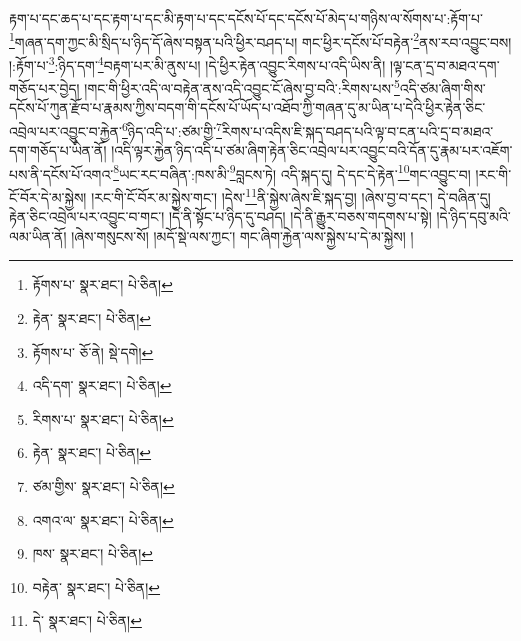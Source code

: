 རྟག་པ་དང་ཆད་པ་དང་རྟག་པ་དང་མི་རྟག་པ་དང་དངོས་པོ་དང་དངོས་པོ་མེད་པ་གཉིས་ལ་སོགས་པ་:རྟོག་པ་\footnote{རྟོགས་པ་  སྣར་ཐང་།  པེ་ཅིན། }གཞན་དག་ཀྱང་མི་སྲིད་པ་ཉིད་དོ་ཞེས་བསྟན་པའི་ཕྱིར་བཤད་པ། གང་ཕྱིར་དངོས་པོ་བརྟེན་\footnote{རྟེན་  སྣར་ཐང་།  པེ་ཅིན། }ནས་རབ་འབྱུང་བས། །:རྟོག་པ་\footnote{རྟོགས་པ་  ཅོ་ནེ།  སྡེ་དགེ། }:ཉིད་དག་\footnote{འདི་དག་  སྣར་ཐང་།  པེ་ཅིན། }བརྟག་པར་མི་ནུས་པ། །དེ་ཕྱིར་རྟེན་འབྱུང་རིགས་པ་འདི་ཡིས་ནི། །ལྟ་ངན་དྲ་བ་མཐའ་དག་གཅོད་པར་བྱེད། །གང་གི་ཕྱིར་འདི་ལ་བརྟེན་ནས་འདི་འབྱུང་ངོ་ཞེས་བྱ་བའི་:རིགས་པས་\footnote{རིགས་པ་  སྣར་ཐང་།  པེ་ཅིན། }འདི་ཙམ་ཞིག་གིས་དངོས་པོ་ཀུན་རྫོབ་པ་རྣམས་ཀྱིས་བདག་གི་དངོས་པོ་ཡོད་པ་འཐོབ་ཀྱི་གཞན་དུ་མ་ཡིན་པ་དེའི་ཕྱིར་རྟེན་ཅིང་འབྲེལ་པར་འབྱུང་བ་རྐྱེན་\footnote{རྟེན་  སྣར་ཐང་།  པེ་ཅིན། }ཉིད་འདི་པ་:ཙམ་གྱི་\footnote{ཙམ་གྱིས་  སྣར་ཐང་།  པེ་ཅིན། }རིགས་པ་འདིས་ཇི་སྐད་བཤད་པའི་ལྟ་བ་ངན་པའི་དྲ་བ་མཐའ་དག་གཅོད་པ་ཡིན་ནོ། །འདི་ལྟར་རྐྱེན་ཉིད་འདི་པ་ཙམ་ཞིག་རྟེན་ཅིང་འབྲེལ་པར་འབྱུང་བའི་དོན་དུ་རྣམ་པར་འཇོག་པས་ནི་དངོས་པོ་འགའ་\footnote{འགའ་ལ་  སྣར་ཐང་།  པེ་ཅིན། }ཡང་རང་བཞིན་:ཁས་མི་\footnote{ཁས་  སྣར་ཐང་།  པེ་ཅིན། }བླངས་ཏེ། འདི་སྐད་དུ། དེ་དང་དེ་རྟེན་\footnote{བརྟེན་  སྣར་ཐང་།  པེ་ཅིན། }གང་འབྱུང་བ། །རང་གི་ངོ་བོར་དེ་མ་སྐྱེས། །རང་གི་ངོ་བོར་མ་སྐྱེས་གང་། །དེས་\footnote{དེ་  སྣར་ཐང་།  པེ་ཅིན། }ནི་སྐྱེས་ཞེས་ཇི་སྐད་བྱ། །ཞེས་བྱ་བ་དང་། དེ་བཞིན་དུ། རྟེན་ཅིང་འབྲེལ་པར་འབྱུང་བ་གང་། །དེ་ནི་སྟོང་པ་ཉིད་དུ་བཤད། །དེ་ནི་རྒྱུར་བཅས་གདགས་པ་སྟེ། །དེ་ཉིད་དབུ་མའི་ལམ་ཡིན་ནོ། །ཞེས་གསུངས་སོ། །མདོ་སྡེ་ལས་ཀྱང་། གང་ཞིག་རྐྱེན་ལས་སྐྱེས་པ་དེ་མ་སྐྱེས། །
